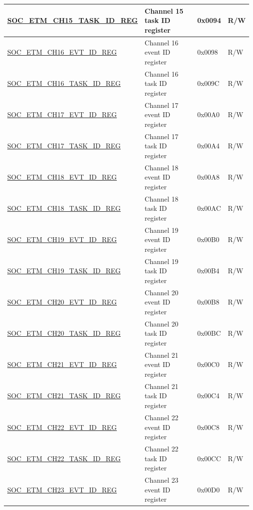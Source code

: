 \begin{longtable}{ | p{6cm} | p{6.2cm} | p{1.3cm} | p{2cm} | }
\hyperref[regdesc:SOCETMCHNTASKIDREG]{SOC\_ETM\_CH15\_TASK\_ID\_REG} & Channel 15 task ID register & 0x0094 & R/W \\ \hline
\hyperref[regdesc:SOCETMCHNEVTIDREG]{SOC\_ETM\_CH16\_EVT\_ID\_REG} & Channel 16 event ID register & 0x0098 & R/W \\ \hline
\hyperref[regdesc:SOCETMCHNTASKIDREG]{SOC\_ETM\_CH16\_TASK\_ID\_REG} & Channel 16 task ID register & 0x009C & R/W \\ \hline
\hyperref[regdesc:SOCETMCHNEVTIDREG]{SOC\_ETM\_CH17\_EVT\_ID\_REG} & Channel 17 event ID register & 0x00A0 & R/W \\ \hline
\hyperref[regdesc:SOCETMCHNTASKIDREG]{SOC\_ETM\_CH17\_TASK\_ID\_REG} & Channel 17 task ID register & 0x00A4 & R/W \\ \hline
\hyperref[regdesc:SOCETMCHNEVTIDREG]{SOC\_ETM\_CH18\_EVT\_ID\_REG} & Channel 18 event ID register & 0x00A8 & R/W \\ \hline
\hyperref[regdesc:SOCETMCHNTASKIDREG]{SOC\_ETM\_CH18\_TASK\_ID\_REG} & Channel 18 task ID register & 0x00AC & R/W \\ \hline
\hyperref[regdesc:SOCETMCHNEVTIDREG]{SOC\_ETM\_CH19\_EVT\_ID\_REG} & Channel 19 event ID register & 0x00B0 & R/W \\ \hline
\hyperref[regdesc:SOCETMCHNTASKIDREG]{SOC\_ETM\_CH19\_TASK\_ID\_REG} & Channel 19 task ID register & 0x00B4 & R/W \\ \hline
\hyperref[regdesc:SOCETMCHNEVTIDREG]{SOC\_ETM\_CH20\_EVT\_ID\_REG} & Channel 20 event ID register & 0x00B8 & R/W \\ \hline
\hyperref[regdesc:SOCETMCHNTASKIDREG]{SOC\_ETM\_CH20\_TASK\_ID\_REG} & Channel 20 task ID register & 0x00BC & R/W \\ \hline
\hyperref[regdesc:SOCETMCHNEVTIDREG]{SOC\_ETM\_CH21\_EVT\_ID\_REG} & Channel 21 event ID register & 0x00C0 & R/W \\ \hline
\hyperref[regdesc:SOCETMCHNTASKIDREG]{SOC\_ETM\_CH21\_TASK\_ID\_REG} & Channel 21 task ID register & 0x00C4 & R/W \\ \hline
\hyperref[regdesc:SOCETMCHNEVTIDREG]{SOC\_ETM\_CH22\_EVT\_ID\_REG} & Channel 22 event ID register & 0x00C8 & R/W \\ \hline
\hyperref[regdesc:SOCETMCHNTASKIDREG]{SOC\_ETM\_CH22\_TASK\_ID\_REG} & Channel 22 task ID register & 0x00CC & R/W \\ \hline
\hyperref[regdesc:SOCETMCHNEVTIDREG]{SOC\_ETM\_CH23\_EVT\_ID\_REG} & Channel 23 event ID register & 0x00D0 & R/W \\ \hline

\end{longtable}
